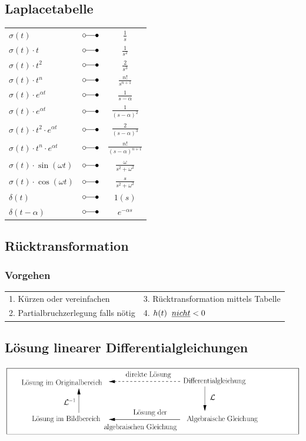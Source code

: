 	\subsection{Laplacetabelle}
	\begin{center}
		\begin{tabular}{|lcc|}
		\hline
			$\sigma \left( t \right)$ & $\laplace$ & $\frac{1}{s}$ \\
			$\sigma \left( t \right) \cdot t$ & $\laplace$ & $\frac{1}{s^2}$\\
			$\sigma \left( t \right) \cdot t^2$ & $\laplace$ & $\frac{2}{s^3}$\\
			$\sigma \left( t \right) \cdot t^n$ & $\laplace$ & $\frac{n!}{s^{n+1}}$\\
			$\sigma \left( t \right) \cdot e^{\alpha t}$ & $\laplace$ &
			$\frac{1}{s-\alpha}$\\
			$\sigma \left( t \right) \cdot e^{\alpha t}$ & $\laplace$ &
			$\frac{1}{( s - \alpha )^2}$\\
			$\sigma \left( t \right)\cdot t^2 \cdot e^{\alpha t}$ &
			$\laplace$ & $\frac{2}{{( s - \alpha )}^3}$\\
			$\sigma \left( t \right)\cdot t^n \cdot e^{ \alpha t}$ &
			$\laplace$ & $\frac{n!}{(s-\alpha)^{n+1}}$\\
			$\sigma \left( t \right) \cdot \sin \left(\omega t \right)$ & $\laplace$ &
			$\frac{\omega}{s^2 + {\omega^2}}$\\
			$\sigma \left( t \right) \cdot \cos \left( \omega t \right)$ & $\laplace$ &
			$\frac{s}{ s^2 + \omega^2}$\\
			$\delta \left( t \right)$ & $\laplace$ & $1\left( s \right)$ \\
			$\delta \left( t - \alpha \right)$ & $\laplace$ & $e^{- \alpha s}$\\
		\hline
		\end{tabular}
	\end{center}
		
	\subsection{Rücktransformation}
		\subsubsection{Vorgehen}
			\begin{tabular}{p{6cm}p{6cm}}
				1. Kürzen oder vereinfachen &
				3. Rücktransformation mittels Tabelle \\
				2. Partialbruchzerlegung falls nötig &
				4. $h(t)\hspace{0.2cm}\underline{nicht} < 0$ \\
			\end{tabular}
	
	\subsection{Lösung linearer Differentialgleichungen}
				\includegraphics[width=14cm]{./bilder/diffgleichungen.png}
				